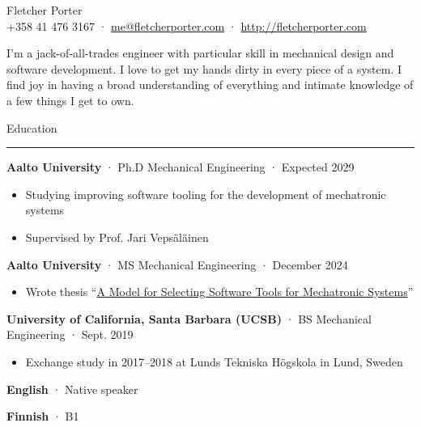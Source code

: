 \documentclass[12pt, oneside]{article}
\newcommand{\titlestyle}[1] {
	{\fontsize{40pt}{1em}\selectfont \textcolor{new_red}{\textsf{#1}}} \\
}
\newcommand{\headingstyleJobs}[1] {
	{\fontsize{18pt}{1em}\selectfont \textcolor{new_red}{\textsf{#1}}}
	\textcolor{new_red}{\rule{3.25in}{0.5pt}} \vspace{3pt}
}
\newcommand{\infostyle}[1] {
	{\selectfont #1} \\ %
}
\newcommand{\jobtitle}[3] {
	{\bf #1} · {#2} · {#3} \vspace{-7pt} \\
}
\newcommand{\certification}[2] {
	{\bf #1} · {#2}
}
\renewenvironment{quote}{%
  \list{}{%
    \leftmargin4pt
    \rightmargin\leftmargin
  }
  \item\relax
}
{\endlist}
\newcommand{\overview}[1] {
	\begin{quote}
		#1
	\end{quote}
}
\begin{document}
\begin{flushleft}



\titlestyle{Fletcher Porter}
\infostyle{+358 41 476 3167 · \href{mailto:me@fletcherporter.com}{me@fletcherporter.com} · \url{http://fletcherporter.com}}

\overview{
I'm a jack-of-all-trades engineer with particular skill in mechanical design and software development.  I love to get my hands dirty in every piece of a system.  I find joy in having a broad understanding of everything and intimate knowledge of a few things I get to own.
}

\headingstyleJobs{Education}

\jobtitle{Aalto University}{Ph.D Mechanical Engineering}{Expected 2029}
\begin{itemize}
  \item Studying improving software tooling for the development of mechatronic systems
  \item Supervised by Prof. Jari Vepsäläinen
\end{itemize}

\jobtitle{Aalto University}{MS Mechanical Engineering}{December 2024}
\begin{itemize}
    \item Wrote thesis ``\href{https://aaltodoc.aalto.fi/items/d2e174be-633b-4896-a8c2-fa90887524a5}{A Model for Selecting Software Tools for Mechatronic Systems}''
\end{itemize}

\jobtitle{University of California, Santa Barbara (UCSB)}{BS Mechanical Engineering}{Sept. 2019}
\begin{itemize}
	\item Exchange study in 2017–2018 at Lunds Tekniska Högskola in Lund, Sweden \\
\end{itemize}


\certification{English}{Native speaker} \certification{Finnish}{B1} \vspace{5pt}


\end{flushleft}
\end{document}
